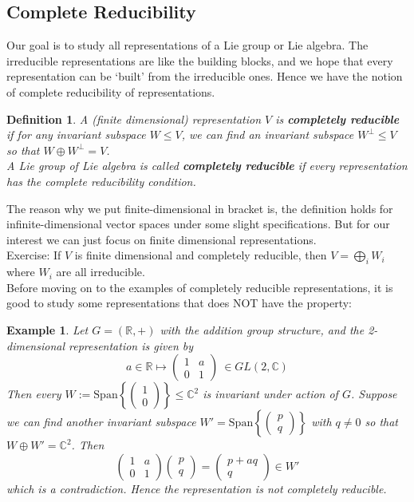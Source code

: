 \documentclass[11pt]{article}
\newtheorem{example}[theorem]{Example}
\newtheorem{definition}[theorem]{Definition}
\newcommand{\bb}[1]{\mathbb{#1}}
\begin{document}
\subsection{Complete Reducibility}
Our goal is to study all representations of a Lie group or Lie algebra. The irreducible representations are like the building blocks, and we hope that every representation can be `built' from the irreducible ones. Hence we have the notion of complete reducibility of representations.
\begin{definition}
A (finite dimensional) representation $V$ is \textbf{completely reducible} if for any invariant subspace $W \leq V$, we can find an invariant subspace $W^{\perp} \leq V$ so that $W \oplus W^{\perp} = V$.\\
A Lie group of Lie algebra is called \textbf{completely reducible} if every representation has the complete reducibility condition.
\end{definition}
The reason why we put finite-dimensional in bracket is, the definition holds for infinite-dimensional vector spaces under some slight specifications. But for our interest we can just focus on finite dimensional representations.\\
Exercise: If $V$ is finite dimensional and completely reducible, then $V = \bigoplus_i W_i$ where $W_i$ are all irreducible.\\
Before moving on to the examples of completely reducible representations, it is good to study some representations that does NOT have the property:
\begin{example}
Let $G = (\bb{R},+)$ with the addition group structure, and the 2-dimensional representation is given by
$$a \in \bb{R} \mapsto \left( \begin{array}{cc}
 1 & a\\
0 & 1 \end{array} \right)\ \in GL(2,\bb{C})$$
Then every $W := \mathrm{Span}\left\{\left( \begin{array}{c}
 1 \\
0  \end{array} \right)\right\} \leq \bb{C}^2$ is invariant under action of $G$. Suppose we can find another invariant subspace $W' = \mathrm{Span}\left\{\left( \begin{array}{c}
 p \\
q  \end{array} \right)\right\}$ with $q \neq 0$ so that $W \oplus W' = \bb{C}^2$. Then
$$\left( \begin{array}{cc}
 1 & a \\
0 & 1  \end{array} \right)\left( \begin{array}{c}
 p \\
q  \end{array} \right) = \left( \begin{array}{c}
 p+aq \\
q  \end{array} \right) \in W'$$
which is a contradiction. Hence the representation is not completely reducible.
\end{example}
\end{document}
